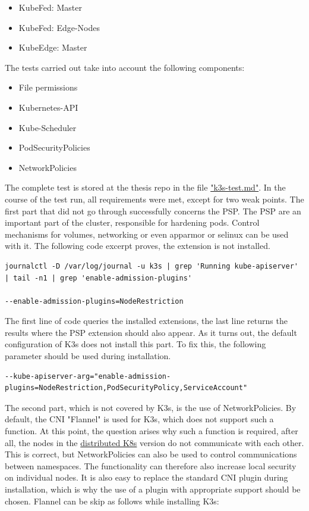 \documentclass[MSC,Master,english]{twbook}%
\begin{document}
\begin{itemize}
    \itemsep0em
    \item KubeFed: Master
    \item KubeFed: Edge-Nodes
    \item KubeEdge: Master 
\end{itemize}

The tests carried out take into account the following components:
\begin{itemize}
    \itemsep0em
    \item File permissions
    \item Kubernetes-API
    \item Kube-Scheduler
    \item PodSecurityPolicies
    \item NetworkPolicies
\end{itemize}
The complete test is stored at the thesis repo\cite{bk-gh-repo} in the file \hyperref{RL: https://github.com/Berndinox/}{}{}{"k3s-test.md"}\cite{bk-gh-k3s-test}. In the course of the test run, all requirements were met, except for two weak points. The first part that did not go through successfully concerns the \ac{PSP}. The \ac{PSP} are an important part of the cluster, responsible for hardening pods. Control mechanisms for volumes, networking or even apparmor or selinux can be used with it. The following code excerpt proves, the extension is not installed.


\begin{lstlisting}[caption={K3s PSP test},captionpos=b]
journalctl -D /var/log/journal -u k3s | grep 'Running kube-apiserver' | tail -n1 | grep 'enable-admission-plugins'

--enable-admission-plugins=NodeRestriction 
\end{lstlisting}

The first line of code queries the installed extensions, the last line returns the results where the \ac{PSP} extension should also appear. As it turns out, the default configuration of K3s does not install this part. To fix this, the following parameter should be used during installation.

\begin{lstlisting}[basicstyle=\tiny,caption={K3s PSP install},captionpos=b]
--kube-apiserver-arg="enable-admission-plugins=NodeRestriction,PodSecurityPolicy,ServiceAccount"
\end{lstlisting}

The second part, which is not covered by K3s, is the use of NetworkPolicies. By default, the \ac{CNI} "Flannel"\cite{flannel} is used for K3s, which does not support such a function. At this point, the question arises why such a function is required, after all, the nodes in the \hyperref[sec:disk8s]{distributed K8s} version do not communicate with each other. This is correct, but NetworkPolicies can also be used to control communications between namespaces. The functionality can therefore also increase local security on individual nodes. It is also easy to replace the standard \ac{CNI} plugin during installation, which is why the use of a plugin with appropriate support should be chosen. Flannel can be skip as follows while installing K3s:
\end{document}
